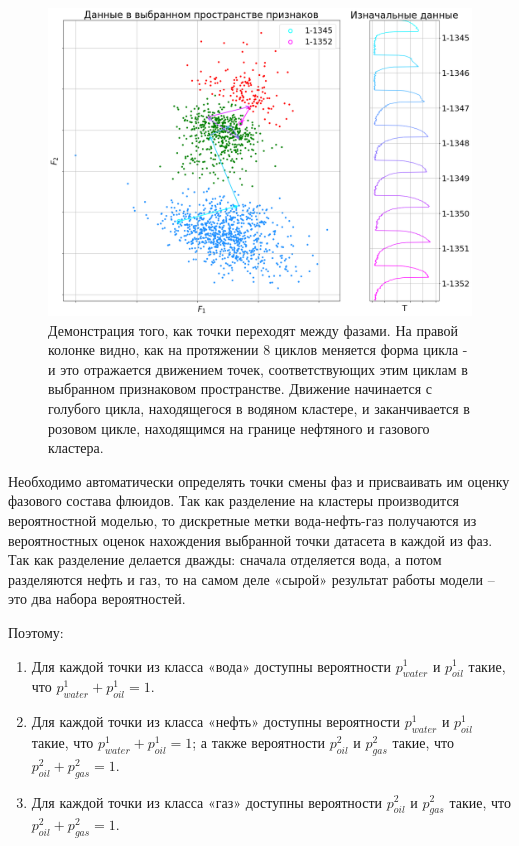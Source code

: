 \begin{figure}[H]
\centering
\includegraphics[width=1.0\textwidth]{TA/sensor_1_phase_change_demo.png}
\caption{Демонстрация того, как точки переходят между фазами. На правой колонке видно, как на протяжении 8 циклов меняется форма цикла - и это отражается движением точек, соответствующих этим циклам в выбранном признаковом пространстве. Движение начинается с голубого цикла, находящегося в водяном кластере, и заканчивается в розовом цикле, находящимся на границе нефтяного и газового кластера.}
\label{fig:sensor_1_phase_change_demo}
\end{figure}

\par
Необходимо автоматически определять точки смены фаз и присваивать им оценку фазового состава флюидов.
Так как разделение на кластеры производится вероятностной моделью, то дискретные метки вода-нефть-газ получаются из вероятностных оценок нахождения выбранной точки датасета в каждой из фаз. Так как разделение делается дважды: сначала отделяется вода, а потом разделяются нефть и газ, то на самом деле «сырой» результат работы модели – это два набора вероятностей.  
\par
Поэтому:
\begin{enumerate}[label=\arabic*.]
    \item Для каждой точки из класса «вода» доступны вероятности $p_{water}^1$ и $p_{oil}^1$ такие, что $p_{water}^1+p_{oil}^1=1$.
    \item Для каждой точки из класса «нефть» доступны вероятности $p_{water}^1$ и $p_{oil}^1$ такие, что $p_{water}^1+p_{oil}^1=1$; а также вероятности $p_{oil}^2$ и $p_{gas}^2$ такие, что $p_{oil}^2+p_{gas}^2=1$.
    \item Для каждой точки из класса «газ» доступны вероятности $p_{oil}^2$ и $p_{gas}^2$ такие, что $p_{oil}^2+p_{gas}^2=1$.
\end{enumerate}

